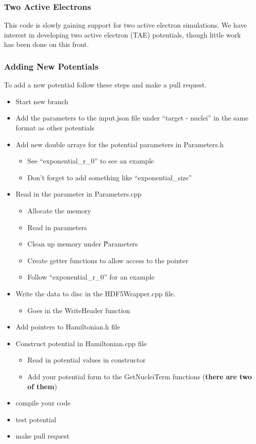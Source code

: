 \documentclass{article}
\begin{document}
\subsubsection{Two Active Electrons} %
\label{ssub:two_active_electrons}
This code is slowly gaining support for two active electron simulations. We have interest in developing two active electron (TAE) potentials, though little work has been done on this front.

\subsubsection{Adding New Potentials} %
\label{ssub:adding_new_potentials}
To add a new potential follow these steps and make a pull request.
\begin{itemize}
  \item Start new branch
  \item Add the parameters to the input.json file under ``target - nuclei'' in the same format as other potentials
  \item Add new double arrays for the potential parameters in Parameters.h
  \begin{itemize}
    \item See ``exponential\_r\_0'' to see an example
    \item Don't forget to add something like ``exponential\_size''
  \end{itemize}
  \item Read in the parameter in Parameters.cpp
  \begin{itemize}
    \item Allocate the memory
    \item Read in parameters
    \item Clean up memory under \~Parameters
    \item Create getter functions to allow access to the pointer
    \item Follow ``exponential\_r\_0'' for an example
  \end{itemize}
  \item Write the data to disc in the HDF5Wrapper.cpp file.
  \begin{itemize}
    \item Goes in the WriteHeader function
  \end{itemize}
  \item Add pointers to Hamiltonian.h file
  \item Construct potential in Hamiltonian.cpp file
  \begin{itemize}
    \item Read in potential values in constructor
    \item Add your potential form to the GetNucleiTerm functions (\textbf{there are two of them})
  \end{itemize}
  \item compile your code
  \item test potential
  \item make pull request
\end{itemize}
\end{document}
